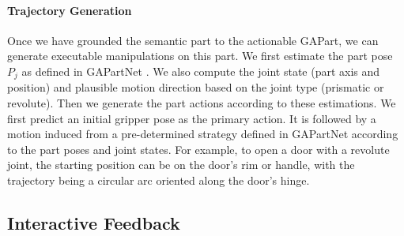 

\paragraph{Trajectory Generation}
Once we have grounded the semantic part to the actionable GAPart, we can generate executable manipulations on this part. We first estimate the part pose $P_j$ as defined in GAPartNet \citep{geng2022gapartnet}. We also compute the joint state (part axis and position) and plausible motion direction based on the joint type (prismatic or revolute).
%
Then we generate the part actions according to these estimations. We first predict an initial gripper pose as the primary action. It is followed by a motion induced from a pre-determined strategy defined in GAPartNet \citep{geng2022gapartnet} according to the part poses and joint states. For example, to open a door with a revolute joint, the starting position can be on the door's rim or handle, with the trajectory being a circular arc oriented along the door's hinge.




\subsection{Interactive Feedback}

